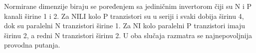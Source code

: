 Normirane dimenzije biraju se poređenjem sa jediničnim invertorom čiji su N i P kanali širine 1 i 2. Za NILI kolo P tranzistori su u seriji i svaki dobija širinu 4, dok su paralelni N tranzistori širine 1. Za NI kolo paralelni P tranzistori imaju širinu 2, a redni N tranzistori širinu 2. U oba slučaja razmatra se najnepovoljnija provodna putanja.
